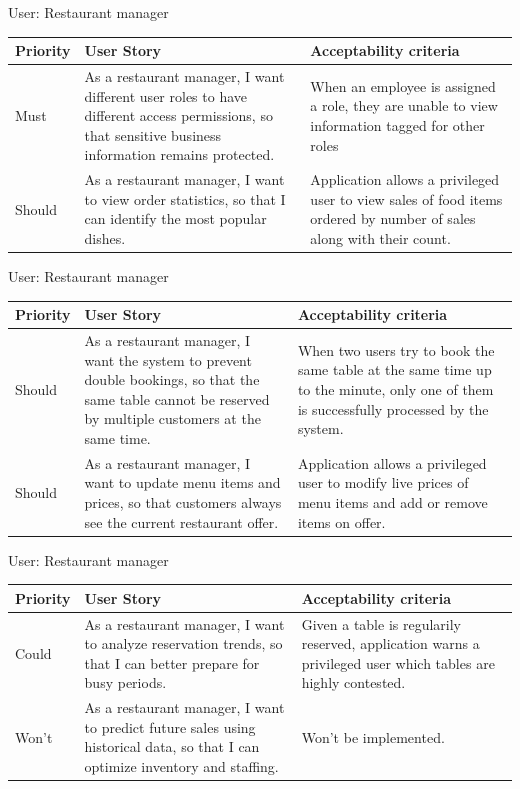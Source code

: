 \documentclass{beamer}
\begin{document}
\begin{frame}{User: Restaurant manager}
\begin{tabular}{| l | p{4cm} | p{4cm} |}
\hline
Priority & User Story & Acceptability criteria \\
\hline
Must & As a restaurant manager, I want different user roles to have different access permissions, so that sensitive business information remains protected.
     & When an employee is assigned a role, they are unable to view information tagged for other roles \\
\hline
Should & As a restaurant manager, I want to view order statistics, so that I can identify the most popular dishes.
       & Application allows a privileged user to view sales of food items ordered by number of sales along with their count. \\
\hline
\end{tabular}
\end{frame}

\begin{frame}{User: Restaurant manager}
\begin{tabular}{| l | p{4cm} | p{4cm} |}
\hline
Priority & User Story & Acceptability criteria \\
\hline
Should & As a restaurant manager, I want the system to prevent double bookings, so that the same table cannot be reserved by multiple customers at the same time.
       & When two users try to book the same table at the same time up to the minute, only one of them is successfully processed by the system. \\
\hline
Should & As a restaurant manager, I want to update menu items and prices, so that customers always see the current restaurant offer.
       & Application allows a privileged user to modify live prices of menu items and add or remove items on offer. \\
\hline
\end{tabular}
\end{frame}

\begin{frame}{User: Restaurant manager}
\begin{tabular}{| l | p{4cm} | p{4cm} |}
\hline
Priority & User Story & Acceptability criteria \\
\hline
Could & As a restaurant manager, I want to analyze reservation trends, so that I can better prepare for busy periods.
      & Given a table is regularily reserved, application warns a privileged user which tables are highly contested. \\
\hline
Won't & As a restaurant manager, I want to predict future sales using historical data, so that I can optimize inventory and staffing.
      & Won't be implemented. \\
\hline
\end{tabular}
\end{frame}
\end{document}
